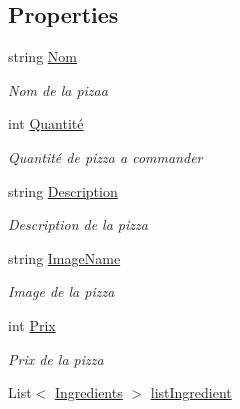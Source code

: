 \subsection*{Properties}
\begin{DoxyCompactItemize}
\item 
string \hyperlink{classModele_1_1Pizza_acd4ac908946cc662e4d4dc6e77b302d1}{Nom}
\begin{DoxyCompactList}\small\item\em Nom de la pizaa \end{DoxyCompactList}\item 
int \hyperlink{classModele_1_1Pizza_ae755ca79feb6f9a522aa18544c3f1310}{Quantité}
\begin{DoxyCompactList}\small\item\em Quantité de pizza a commander \end{DoxyCompactList}\item 
string \hyperlink{classModele_1_1Pizza_a5e6e4375e83eebb37581adcbebf9b045}{Description}
\begin{DoxyCompactList}\small\item\em Description de la pizza \end{DoxyCompactList}\item 
string \hyperlink{classModele_1_1Pizza_ababa571729fe09ebe01cf875451999ea}{Image\+Name}
\begin{DoxyCompactList}\small\item\em Image de la pizza \end{DoxyCompactList}\item 
int \hyperlink{classModele_1_1Pizza_a8a8c0efc22d46be85489d220228733ca}{Prix}
\begin{DoxyCompactList}\small\item\em Prix de la pizza \end{DoxyCompactList}\item 
List$<$ \hyperlink{namespaceModele_a001a8e89e56a724f24a249ba98080d41}{Ingredients} $>$ \hyperlink{classModele_1_1Pizza_ae05b1d6e08e5f801e3902c9c572a530b}{list\+Ingredient}
\end{DoxyCompactItemize}
